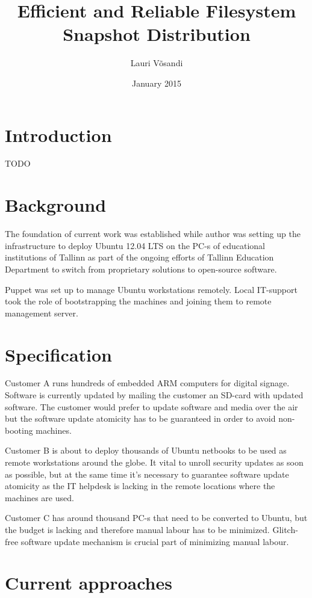 \documentclass{article}
\title{Efficient and Reliable Filesystem Snapshot Distribution}
\author{Lauri Võsandi}
\date{January 2015}
\begin{document}
\maketitle

\section{Introduction}

TODO

\section{Background}

The foundation of current work was established while author was setting up the infrastructure to deploy Ubuntu 12.04 LTS on the PC-s of educational institutions of Tallinn as part of the ongoing efforts of Tallinn Education Department to switch from proprietary solutions to open-source software.

Puppet was set up to manage Ubuntu workstations remotely. Local IT-support took the role of bootstrapping the machines and joining them to remote management server.


\section{Specification}

Customer A runs hundreds of embedded ARM computers for digital signage. Software is currently updated by mailing the customer an SD-card with updated software. The customer would prefer to update software and media over the air but the software update atomicity has to be guaranteed in order to avoid non-booting machines.

Customer B is about to deploy thousands of Ubuntu netbooks to be used as remote workstations around the globe. It vital to unroll security updates as soon as possible, but at the same time it's necessary to guarantee software update atomicity as the IT helpdesk is lacking in the remote locations where the machines are used.

Customer C has around thousand PC-s that need to be converted to Ubuntu, but the budget is lacking and therefore manual labour has to be minimized. Glitch-free software update mechanism is crucial part of minimizing manual labour.

\section{Current approaches}
\end{document}
